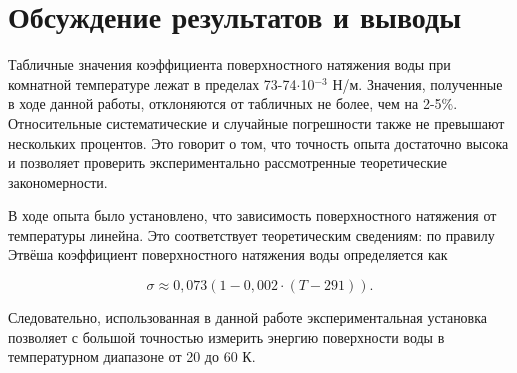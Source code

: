 \documentclass[a4paper,12pt]{article} %
\begin{document}
\section{Обсуждение результатов и выводы}

Табличные значения коэффициента поверхностного натяжения воды при комнатной температуре лежат в пределах 73-74$\cdot$10$^{-3}$ Н/м. Значения, полученные в ходе данной работы, отклоняются от табличных не более, чем на 2-5\%. Относительные систематические и случайные погрешности также не превышают нескольких процентов. Это говорит о том, что точность опыта достаточно высока и позволяет проверить экспериментально рассмотренные теоретические закономерности.

В ходе опыта было установлено, что зависимость поверхностного натяжения от температуры линейна. Это соответствует теоретическим сведениям: по правилу Этвёша коэффициент поверхностного натяжения воды определяется как

\begin{equation}
    \sigma \approx 0,073 (1 - 0,002 \cdot (T - 291)).
\end{equation}

Следовательно, использованная в данной работе экспериментальная установка позволяет с большой точностью измерить энергию поверхности воды в температурном диапазоне от 20 до 60 К.
\end{document}
